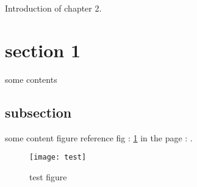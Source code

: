Introduction of chapter 2.
\section {section 1}
some contents
\subsection{subsection}
some content
figure reference fig : \ref{fig:test} in the page : \pageref{fig:test}.
\begin{figure}[h]
		\centering
		\texttt{[image: test]}
		\caption{test figure}
		\label{fig:test}
\end{figure}

 
 